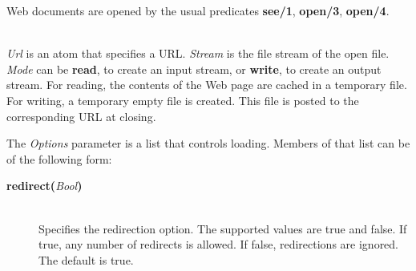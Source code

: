 Web documents are opened by the usual predicates {\bf see/1}, {\bf open/3},
{\bf open/4}.

\begin{description}



\\

{\it Url} is an atom that specifies a URL.
\emph{Stream} is the file stream of the open file.
{\it Mode} can be
\textbf{read}, to create an input stream, or
{\bf write},  to create an output stream.
For reading, the contents of the Web page are cached in a temporary file.
For writing, a temporary empty file is created. This file is posted to the
corresponding URL at closing.

The {\it Options} parameter is a list that controls loading. Members of that list can be of the following form:

  \begin{description}
  \item[{\bf redirect}{\bf (}{\it Bool}{\bf )}]\mbox{}
    \\
    Specifies the redirection option. The supported values are true and
    false. If true, any number of redirects is allowed. If false,
    redirections are ignored.
    The default is true.


\end{description}
\end{description}
